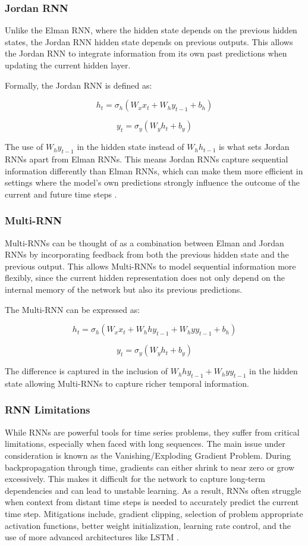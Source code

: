 \documentclass[conference]{IEEEtran}
\begin{document}
\subsubsection{\textbf{Jordan RNN}}

Unlike the Elman RNN, where the hidden state depends on the previous hidden states, the Jordan RNN hidden state depends on previous outputs. This allows the Jordan RNN to integrate information from its own past predictions when updating the current hidden layer.

Formally, the Jordan RNN is defined as:

$$
h_t = \sigma_h(W_x x_t + W_h y_{t-1} + b_h)
$$

$$
y_t = \sigma_y(W_y h_t + b_y)
$$

The use of $W_h y_{t-1}$ in the hidden state instead of $W_h h_{t-1}$ is what sets Jordan RNNs apart from Elman RNNs. This means Jordan RNNs capture sequential information differently than Elman RNNs, which can make them more efficient in settings where the model's own predictions strongly influence the outcome of the current and future time steps \cite{jordan_rnn}.

\subsubsection{\textbf{Multi-RNN}}

Multi-RNNs can be thought of as a combination between Elman and Jordan RNNs by incorporating feedback from both the previous hidden state and the previous output. This allows Multi-RNNs to model sequential information more flexibly, since the current hidden representation does not only depend on the internal memory of the network but also its previous predictions.

The Multi-RNN can be expressed as:

$$
h_t = \sigma_h(W_x x_t + W_hh y_{t-1} + W_hy y_{t-1} + b_h)
$$

$$
y_t = \sigma_y(W_y h_t + b_y)
$$

The difference is captured in the inclusion of $W_hh y_{t-1} + W_hy y_{t-1}$ in the hidden state allowing Multi-RNNs to capture richer temporal information.

\subsubsection{\textbf{RNN Limitations}}

While RNNs are powerful tools for time series problems, they suffer from critical limitations, especially when faced with long sequences. The main issue under consideration is known as the Vanishing/Exploding Gradient Problem. During backpropagation through time, gradients can either shrink to near zero or grow excessively. This makes it difficult for the network to capture long-term dependencies and can lead to unstable learning. As a result, RNNs often struggle when context from distant time steps is needed to accurately predict the current time step. Mitigations include, gradient clipping, selection of problem appropriate activation functions, better weight initialization, learning rate control, and the use of more advanced architectures like LSTM \cite{rnn_problems}. 
\end{document}
